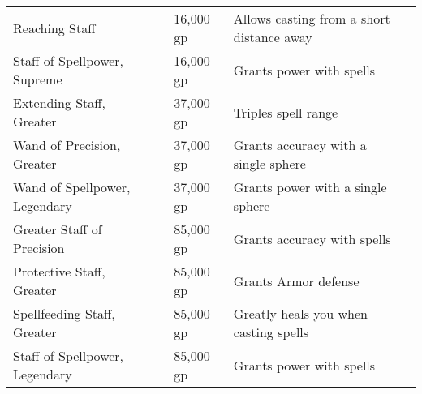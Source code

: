 \begin{longtabuwrapper}
\begin{longtabu}{l l l X l}
Reaching Staff &  & 16,000 gp & Allows casting from a short distance away & \pageref{item:Reaching Staff} \\
Staff of Spellpower, Supreme &  & 16,000 gp & Grants  power with spells & \pageref{item:Staff of Spellpower, Supreme} \\
Extending Staff, Greater &  & 37,000 gp & Triples spell range & \pageref{item:Extending Staff, Greater} \\
Wand of Precision, Greater &  & 37,000 gp & Grants  accuracy with a single sphere & \pageref{item:Wand of Precision, Greater} \\
Wand of Spellpower, Legendary &  & 37,000 gp & Grants  power with a single sphere & \pageref{item:Wand of Spellpower, Legendary} \\
Greater Staff of Precision &  & 85,000 gp & Grants  accuracy with spells & \pageref{item:Greater Staff of Precision} \\
Protective Staff, Greater &  & 85,000 gp & Grants  Armor defense & \pageref{item:Protective Staff, Greater} \\
Spellfeeding Staff, Greater &  & 85,000 gp & Greatly heals you when casting spells & \pageref{item:Spellfeeding Staff, Greater} \\
Staff of Spellpower, Legendary &  & 85,000 gp & Grants  power with spells & \pageref{item:Staff of Spellpower, Legendary} \\
\end{longtabu}
\end{longtabuwrapper}
